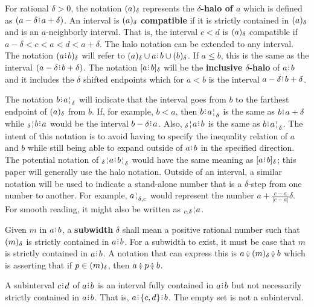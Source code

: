 \documentclass[12pt]{article}
\begin{document}
For rational $\delta > 0$, the notation $(a)_{\delta}$ represents the \textbf{$\delta$-halo of $a$} which is defined as $(a -\delta \rint  a+ \delta)$. An interval is $(a)_{\delta}$ \textbf{compatible }if it is strictly contained in $(a)_{\delta}$ and is an $a$-neighborly interval. That is, the interval $c \lt d$ is $(a)_{\delta}$ compatible if $a- \delta < c < a < d < a+ \delta$. The halo notation can be extended to any interval. The notation $\halo{a\rint b}$ will refer to $\halo{a} \cup a\rint b \cup \halo{b}$. If $a \leq b$, this is the same as the interval $(a-\delta\rint b+\delta)$. The notation $\clhalo{a\rint b}$ will be the \textbf{inclusive $\delta$-halo} of $a\rint b$ and it includes the $\delta$ shifted endpoints which for $a \lt b$ is the interval $a - \delta \rint b+ \delta$. 


The notation $b\rint \fuzbright{a}$ will indicate that the interval goes from $b$ to the farthest endpoint of $(a)_{\delta}$ from $b$. If, for example, $b < a$, then $b\rint \fuzbright{a}$ is the same as $b\rint a+\delta$ while $\fuzbleft{b} \rint a$ would be the interval $b-\delta\rint a$. Also, $\fuzbleft{a} \rint  b$ is the same as $b\rint \fuzbright{a}$.  The intent of this notation is to avoid having to specify the inequality relation of $a$ and $b$ while still being able to expand outside of $a\rint b$ in the specified direction. The potential notation of $\fuzbleft{a}\rint \fuzbright{b}$ would have the same meaning as $[a\rint b]_\delta$; this paper will generally use the halo notation. Outside of an interval, a similar notation will be used to indicate a stand-alone number that is a $\delta$-step from one number to another. For example, $\fuzbright[\delta,c]{a}$ would represent the number $a + \frac{c-a}{|c-a|}\delta$. For smooth reading, it might also be written as $\fuzbleft[c, \delta]{a}$.

Given $m$ in $a \rint  b$, a \textbf{subwidth} $\delta$ shall mean a positive rational number such that $(m)_{\delta}$ is strictly contained in $a\rint b$. For a subwidth to exist, it must be case that $m$ is strictly contained in $a\rint b$. A notation that can express this is $a \betneq \halo{m} \betneq b$ which is asserting that if $p \in (m)_{\delta}$, then $a \betneq p \betneq b$. 

A subinterval $c \rint d$ of $a\rint b$ is an interval fully contained in $a \rint b$ but not necessarily strictly contained in $a \rint b$. That is, $a \rint \{c, d \} \rint b$. The empty set is not a subinterval. 
\end{document}

